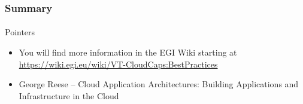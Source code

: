 \begin{frame}
\frametitle{Summary}
\framesubtitle{}
Pointers
\begin{itemize}
\item You will find more information in the EGI Wiki starting at \url{https://wiki.egi.eu/wiki/VT-CloudCaps:BestPractices}
\item George Reese -- Cloud Application Architectures: Building Applications and Infrastructure in the Cloud
\end{itemize}
\end{frame}


